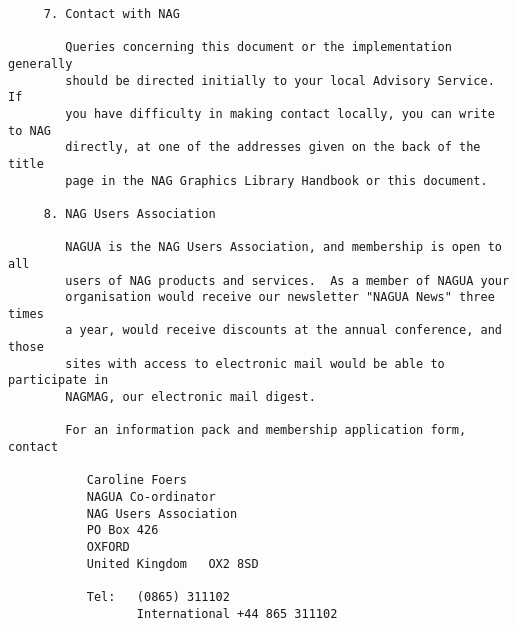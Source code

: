 \begin{verbatim}
     7. Contact with NAG
     
        Queries concerning this document or the implementation generally
        should be directed initially to your local Advisory Service.  If
        you have difficulty in making contact locally, you can write to NAG
        directly, at one of the addresses given on the back of the title
        page in the NAG Graphics Library Handbook or this document.
     
     8. NAG Users Association
     
        NAGUA is the NAG Users Association, and membership is open to all
        users of NAG products and services.  As a member of NAGUA your
        organisation would receive our newsletter "NAGUA News" three times
        a year, would receive discounts at the annual conference, and those
        sites with access to electronic mail would be able to participate in
        NAGMAG, our electronic mail digest.
     
        For an information pack and membership application form, contact
     
           Caroline Foers
           NAGUA Co-ordinator
           NAG Users Association
           PO Box 426
           OXFORD
           United Kingdom   OX2 8SD
     
           Tel:   (0865) 311102
                  International +44 865 311102
     
\end{verbatim}

